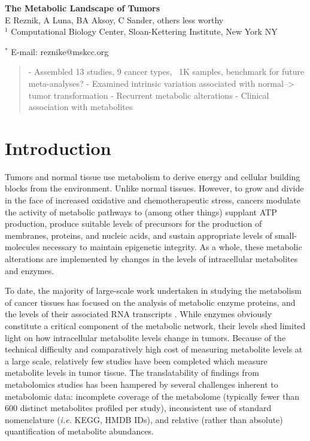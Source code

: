\documentclass[10pt]{article}
\date{}
\begin{document}
\begin{flushleft}
{\Large
\textbf{The Metabolic Landscape of Tumors}
}
\\
E Reznik, A Luna, BA Aksoy, C Sander, others less worthy
\\
$^1$ Computational Biology Center, Sloan-Kettering Institute, New York NY

$^\ast$ E-mail: reznike@mskcc.org
\end{flushleft}

\begin{abstract}
- Assembled 13 studies, 9 cancer types, ~1K samples, benchmark for future meta-analyses?
- Examined intrinsic variation associated with normal--> tumor transformation
- Recurrent metabolic alterations
- Clinical association with metabolites
\end{abstract}

\section{Introduction}

Tumors and normal tissue use metabolism to derive energy and cellular building blocks from the environment. Unlike normal tissues. However, to grow and divide in the face of increased oxidative and chemotherapeutic stress, cancers modulate the activity of metabolic pathways to (among other things) supplant ATP production, produce suitable levels of precursors for the production of membranes, proteins, and nucleic acids, and sustain appropriate levels of small-molecules necessary to maintain epigenetic integrity. As a whole, these metabolic alterations are implemented by changes in the levels of intracellular  metabolites and enzymes.

To date, the majority of large-scale work undertaken in studying the metabolism of cancer tissues has focused on the analysis of metabolic enzyme proteins, and the levels of their associated RNA transcripts \cite{Nilsson2014,Gatto2014,Hu2013}. While enzymes obviously constitute a critical component of the metabolic network, their levels shed limited light on how intracellular metabolite levels change in tumors. Because of the technical difficulty and comparatively high cost of measuring metabolite levels at a large scale, relatively few studies have been completed which measure metabolite levels in tumor tissue. The translatability of findings from metabolomics studies has been hampered by several challenges inherent to metabolomic data: incomplete coverage of the metabolome (typically fewer than 600 distinct metabolites profiled per study), inconsistent use of standard nomenclature (\textit{i.e.} KEGG, HMDB IDs), and relative (rather than absolute) quantification of metabolite abundances.  
\end{document}
